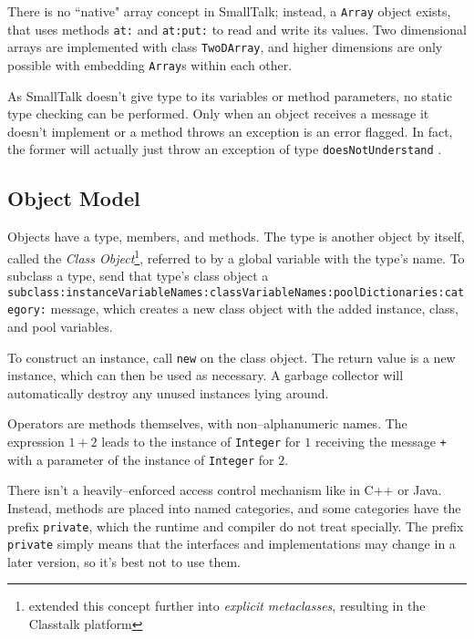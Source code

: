 	There is no ``native" array concept in SmallTalk\cite{567553}; instead, a \texttt{Array} object exists, that uses methods \texttt{at:} and \texttt{at:put:} to read and write its values.  Two dimensional arrays are implemented with class \texttt{TwoDArray}, and higher dimensions are only possible with embedding \texttt{Array}s within each other.

	As SmallTalk doesn't give type to its variables or method parameters, no static type checking can be performed.  Only when an object receives a message it doesn't implement or a method throws an exception is an error flagged.  In fact, the former will actually just throw an exception of type \texttt{doesNotUnderstand} .

	

\subsection{Object Model}

	Objects have a type, members, and methods.  The type is another object by itself, called the \emph{Class Object}\footnote{\cite{74921} extended this concept further into \emph{explicit metaclasses}\cite{74911}, resulting in the Classtalk platform}, referred to by a global variable with the type's name.  To subclass a type, send that type's class object a \texttt{subclass:\-instance\-Variable\-Names:\-class\-Variable\-Names:\-pool\-Dictionaries:\-category:} message, which creates a new class object with the added instance, class, and pool variables.

	To construct an instance, call \texttt{new} on the class object.  The return value is a new instance, which can then be used as necessary.  A garbage collector will automatically destroy any unused instances lying around.

	Operators are methods themselves, with non--alphanumeric names.  The expression $1 + 2$ leads to the instance of \texttt{Integer} for $1$ receiving the message \texttt{+} with a parameter of the instance of \texttt{Integer} for $2$.

	There isn't a heavily--enforced access control mechanism like in C++ or Java.  Instead, methods are placed into named categories, and some categories have the prefix \texttt{private}, which the runtime and compiler do not treat specially.  The prefix \texttt{private} simply means that the interfaces and implementations may change in a later version, so it's best not to use them.

